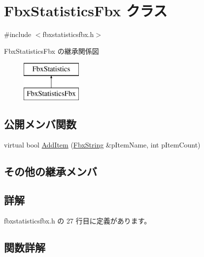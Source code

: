 \hypertarget{class_fbx_statistics_fbx}{}\section{Fbx\+Statistics\+Fbx クラス}
\label{class_fbx_statistics_fbx}


{\ttfamily \#include $<$fbxstatisticsfbx.\+h$>$}

Fbx\+Statistics\+Fbx の継承関係図\begin{figure}[H]
\begin{center}
\leavevmode
\includegraphics[height=2.000000cm]{class_fbx_statistics_fbx}
\end{center}
\end{figure}
\subsection*{公開メンバ関数}
\begin{DoxyCompactItemize}
\item 
virtual bool \hyperlink{class_fbx_statistics_fbx_a572bf7348dca4967ed1b43c7d2e32982}{Add\+Item} (\hyperlink{class_fbx_string}{Fbx\+String} \&p\+Item\+Name, int p\+Item\+Count)
\end{DoxyCompactItemize}
\subsection*{その他の継承メンバ}


\subsection{詳解}


 fbxstatisticsfbx.\+h の 27 行目に定義があります。



\subsection{関数詳解}
\mbox{\label{class_fbx_statistics_fbx_a572bf7348dca4967ed1b43c7d2e32982}} 
